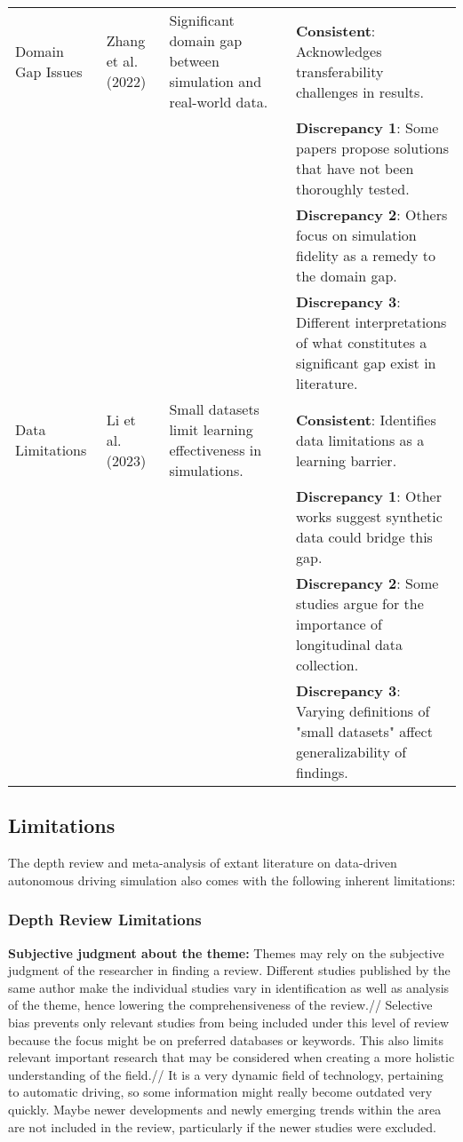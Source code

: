 \documentclass[lettersize,journal]{IEEEtran}
\begin{document}
\begin{longtable}[htbp]{|l|p{3cm}|p{3cm}|p{6.5cm}|}
    Domain Gap Issues & Zhang et al. (2022) & Significant domain gap between simulation and real-world data. & \textbf{Consistent}: Acknowledges transferability challenges in results. \\
    & & & \textbf{Discrepancy 1}: Some papers propose solutions that have not been thoroughly tested. \\
    & & & \textbf{Discrepancy 2}: Others focus on simulation fidelity as a remedy to the domain gap. \\
    & & & \textbf{Discrepancy 3}: Different interpretations of what constitutes a significant gap exist in literature. \\ \hline

    Data Limitations & Li et al. (2023) & Small datasets limit learning effectiveness in simulations. & \textbf{Consistent}: Identifies data limitations as a learning barrier. \\
    & & & \textbf{Discrepancy 1}: Other works suggest synthetic data could bridge this gap. \\
    & & & \textbf{Discrepancy 2}: Some studies argue for the importance of longitudinal data collection. \\
    & & & \textbf{Discrepancy 3}: Varying definitions of "small datasets" affect generalizability of findings. \\ \hline

\end{longtable}
\clearpage
\twocolumn




\subsection{Limitations}
The depth review and meta-analysis of extant literature on data-driven autonomous driving simulation also comes with the following inherent limitations:

\subsubsection{Depth Review Limitations}
\textbf{Subjective judgment about the theme:} Themes may rely on the subjective judgment of the researcher in finding a review. Different studies published by the same author make the individual studies vary in identification as well as analysis of the theme, hence lowering the comprehensiveness of the review.//
Selective bias prevents only relevant studies from being included under this level of review because the focus might be on preferred databases or keywords. This also limits relevant important research that may be considered when creating a more holistic understanding of the field.//
It is a very dynamic field of technology, pertaining to automatic driving, so some information might really become outdated very quickly. Maybe newer developments and newly emerging trends within the area are not included in the review, particularly if the newer studies were excluded.
\end{document}
